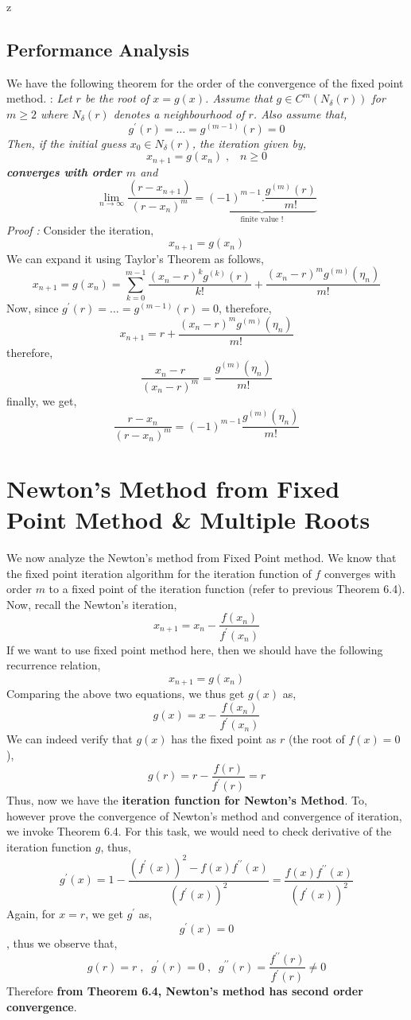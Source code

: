 z\documentclass[a4paper,12pt,twoside]{book}
\newcommand{\nll}[0]{\newline\newline}
\newcommand{\tit}[1]{\textit{#1}}
\newcommand{\theor}[1]{\boxed{\textbf{\textit{Theorem \thechapter.#1}}}}
\begin{document}
\section{Performance Analysis}
We have the following theorem for the order of the convergence of the fixed point method.
\nll
\theor{4}  : \tit{Let $r$ be the root of $x = g(x)$. Assume that $g\in C^m(N_\delta (r))$ for $m\ge 2$ where $N_\delta(r)$ denotes a neighbourhood of $r$. Also assume that,
\[ g^\prime(r) = \dots = g^{(m-1)}(r) = 0\]
Then, if the initial guess $x_0 \in N_\delta(r)$, the iteration given by,
\[x_{n+1} = g(x_n)\;,\;\;\;n\ge 0\]
\textbf{converges with order $m$} and
\[\boxed{\underset{n\to \infty}{\lim} \frac{(r - x_{n+1})}{(r-x_n)^m} = \underbrace{(-1)^{m-1} . \frac{g^{(m)}(r)}{m!}}_{\text{finite value !}}}\]
}
\tit{Proof : } Consider the iteration,
\[ x_{n+1} = g(x_n)\]
We can expand it using Taylor's Theorem as follows,
\[x_{n+1} = g(x_n) = \sum_{k=0}^{m-1} \frac{(x_n - r)^k g^{(k)}(r)}{k!} + \frac{(x_n - r)^m g^{(m)}(\eta_n)}{m!}\]
Now, since $g^\prime(r) = \dots = g^{(m-1)}(r) = 0$, therefore,
\[x_{n+1} = r + \frac{(x_n - r)^m g^{(m)}(\eta_n)}{m!}\]
therefore,
\[\frac{x_n - r}{(x_n - r)^m} = \frac{g^{(m)}(\eta_n)}{m!}\]
finally, we get,
\[\frac{r - x_n}{(r-x_n)^m} = (-1)^{m-1}\frac{g^{(m)}(\eta_n)}{m!}\]

\chapter{Newton's Method from Fixed Point Method \& Multiple Roots}
We now analyze the Newton's method from Fixed Point method.
\nll
We know that the fixed point iteration algorithm for the iteration function of $f$ converges with order $m$ to a fixed point of the iteration function (refer to previous Theorem 6.4).
\nll
Now, recall the Newton's iteration,
\[ x_{n+1} = x_n - \frac{f(x_n)}{f^\prime(x_n)} \]
If we want to use fixed point method here, then we should have the following recurrence relation,
\[ x_{n+1} = g(x_n) \]
Comparing the above two equations, we thus get $g(x)$ as,
\[ g(x) = x - \frac{f(x_n)}{f^\prime(x_n)} \]
We can indeed verify that $g(x)$ has the fixed point as $r$ (the root of $f(x) = 0$),
\[ g(r) = r - \frac{f(r)}{f^\prime(r)} = r\]
Thus, now we have the \textbf{iteration function for Newton's Method}. To, however prove the convergence of Newton's method and convergence of iteration, we invoke Theorem 6.4.
\nll
For this task, we would need to check derivative of the iteration function $g$, thus,
\[g^\prime(x) = 1 - \frac{(f^{\prime}(x))^2 - f(x)f^{\prime\prime}(x)}{(f^\prime(x))^2} = \frac{f(x)f^{\prime\prime}(x)}{(f^\prime(x))^2}\]
Again, for $x=r$, we get $g^\prime$ as,
\[ g^\prime(x) = 0 \],
thus we observe that,
\[g(r) = r \;,\;\; g^\prime(r) = 0\;,\;\; g^{\prime\prime}(r) = \frac{f^{\prime\prime}(r)}{f^\prime(r)} \neq 0\]
Therefore \textbf{from Theorem 6.4, Newton's method has second order convergence}.
\end{document}
